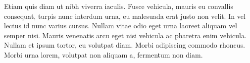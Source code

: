 \documentclass[submission]{gmp2015}
\begin{document}
Etiam quis diam ut nibh viverra iaculis. Fusce vehicula, mauris eu convallis consequat, turpis nunc interdum urna, eu malesuada erat justo non velit. In vel lectus id nunc varius cursus. Nullam vitae odio eget urna laoreet aliquam vel semper nisi. Mauris venenatis arcu eget nisi vehicula ac pharetra enim vehicula. Nullam et ipsum tortor, eu volutpat diam. Morbi adipiscing commodo rhoncus. Morbi urna lorem, volutpat non aliquam a, fermentum non diam.




\end{document}
